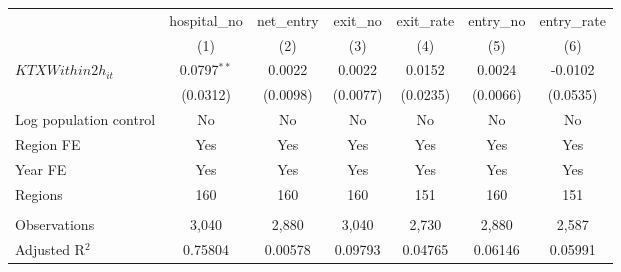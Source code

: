 \begingroup
\centering
\begin{tabular}{lcccccc}
   \toprule
                          & hospital\_no  & net\_entry  & exit\_no  & exit\_rate  & entry\_no  & entry\_rate \\    
                          & (1)           & (2)         & (3)       & (4)         & (5)        & (6)\\  
   \midrule 
   $KTXWithin2h_{it}$     & 0.0797$^{**}$ & 0.0022      & 0.0022    & 0.0152      & 0.0024     & -0.0102\\   
                          & (0.0312)      & (0.0098)    & (0.0077)  & (0.0235)    & (0.0066)   & (0.0535)\\   
   Log population control & No            & No          & No        & No          & No         & No\\  
   Region FE              & Yes           & Yes         & Yes       & Yes         & Yes        & Yes\\  
   Year FE                & Yes           & Yes         & Yes       & Yes         & Yes        & Yes\\  
   Regions                & 160           & 160         & 160       & 151         & 160        & 151\\  
    \\
   Observations           & 3,040         & 2,880       & 3,040     & 2,730       & 2,880      & 2,587\\  
   Adjusted R$^2$         & 0.75804       & 0.00578     & 0.09793   & 0.04765     & 0.06146    & 0.05991\\  
   \bottomrule
\end{tabular}
\par\endgroup
